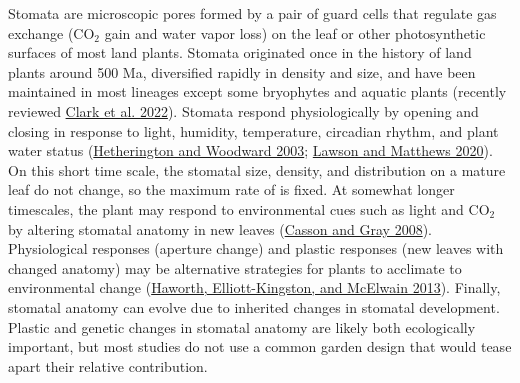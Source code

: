 \documentclass[
  12pt,
]{article}
\begin{document}
Stomata are microscopic pores formed by a pair of guard cells that regulate gas exchange (CO\(_2\) gain and water vapor loss) on the leaf or other photosynthetic surfaces of most land plants. Stomata originated once in the history of land plants around 500 Ma, diversified rapidly in density and size, and have been maintained in most lineages except some bryophytes and aquatic plants (recently reviewed \protect\hyperlink{ref-clark_origin_2022}{Clark et al. 2022}). Stomata respond physiologically by opening and closing in response to light, humidity, temperature, circadian rhythm, and plant water status (\protect\hyperlink{ref-hetherington_role_2003}{Hetherington and Woodward 2003}; \protect\hyperlink{ref-lawson_guard_2020}{Lawson and Matthews 2020}). On this short time scale, the stomatal size, density, and distribution on a mature leaf do not change, so the maximum rate of is fixed. At somewhat longer timescales, the plant may respond to environmental cues such as light and CO\(_2\) by altering stomatal anatomy in new leaves (\protect\hyperlink{ref-casson_influence_2008}{Casson and Gray 2008}). Physiological responses (aperture change) and plastic responses (new leaves with changed anatomy) may be alternative strategies for plants to acclimate to environmental change (\protect\hyperlink{ref-haworth_co-ordination_2013}{Haworth, Elliott-Kingston, and McElwain 2013}). Finally, stomatal anatomy can evolve due to inherited changes in stomatal development. Plastic and genetic changes in stomatal anatomy are likely both ecologically important, but most studies do not use a common garden design that would tease apart their relative contribution.
\end{document}
